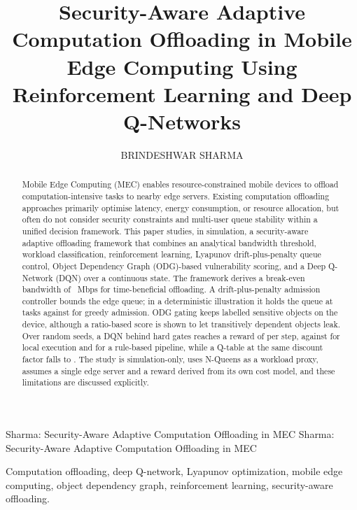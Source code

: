 \documentclass{ieeeaccess}
\begin{document}
\doi{}

\title{Security-Aware Adaptive Computation Offloading in Mobile Edge Computing Using Reinforcement Learning and Deep Q-Networks}
\author{\uppercase{Brindeshwar Sharma}}
\address[1]{Department of Information Technology, Manipal University Jaipur, Jaipur, India (e-mail: brinde.sharma@gmail.com)}

\markboth
{Sharma: Security-Aware Adaptive Computation Offloading in MEC}
{Sharma: Security-Aware Adaptive Computation Offloading in MEC}


\begin{abstract}
Mobile Edge Computing (MEC) enables resource-constrained mobile devices to offload computation-intensive tasks to nearby edge servers. Existing computation offloading approaches primarily optimise latency, energy consumption, or resource allocation, but often do not consider security constraints and multi-user queue stability within a unified decision framework. This paper studies, in simulation, a security-aware adaptive offloading framework that combines an analytical bandwidth threshold, workload classification, reinforcement learning, Lyapunov drift-plus-penalty queue control, Object Dependency Graph (ODG)-based vulnerability scoring, and a Deep Q-Network (DQN) over a continuous state. The framework derives a break-even bandwidth of \RstarNoSetup~Mbps for time-beneficial offloading. A drift-plus-penalty admission controller bounds the edge queue; in a deterministic illustration it holds the queue at \QCtrlDet{} tasks against \QGreedyDet{} for greedy admission. ODG gating keeps labelled sensitive objects on the device, although a ratio-based score is shown to let transitively dependent objects leak. Over \NSeeds{} random seeds, a DQN behind hard gates reaches a reward of \RewDqnG{} per step, against \RewLocal{} for local execution and \RewRules{} for a rule-based pipeline, while a Q-table at the same discount factor falls to \RewQtab. The study is simulation-only, uses N-Queens as a workload proxy, assumes a single edge server and a reward derived from its own cost model, and these limitations are discussed explicitly.
\end{abstract}

\begin{keywords}
Computation offloading, deep Q-network, Lyapunov optimization, mobile edge computing, object dependency graph, reinforcement learning, security-aware offloading.
\end{keywords}
\end{document}
